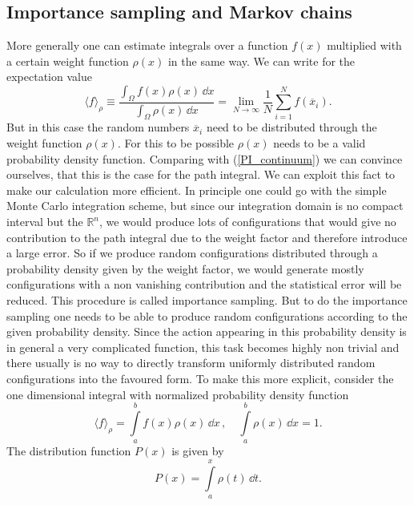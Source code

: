 \subsection{Importance sampling and Markov chains}
More generally one can estimate integrals over a function $f(x)$ multiplied with a certain weight function $\rho(x)$ in the same way. We can write for the expectation value
\begin{equation}
\langle f \rangle_{\rho} \equiv \dfrac{\int _{\Omega} f(x)\rho(x)\,\dd x}{\int _{\Omega} \rho(x)\,\dd x} = \lim\limits_{N\to\infty}\dfrac{1}{N}\sum\limits_{i=1}^{N} f(\overline{x}_{i}).
\end{equation}
But in this case the random numbers $\overline{x}_{i}$ need to be distributed through the weight function $\rho(x)$. For this to be possible $\rho(x)$ needs to be a valid probability density function.
Comparing with (\ref{PI_continuum}) we can convince ourselves, that this is the case for the  path integral. We can exploit this fact to make our calculation more efficient. In principle one could go with the simple Monte Carlo integration scheme, but since our integration domain is no compact interval but the $\mathbb{R}^{n}$, we would produce lots of configurations that would give no contribution to the path integral due to the weight factor and therefore introduce a large error. So if we produce random configurations distributed through a probability density given by the weight factor, we would generate mostly configurations with a non vanishing contribution and the statistical error will be reduced. This procedure is called importance sampling. But to do the importance sampling one needs to be able to produce random configurations according to the given probability density. Since the action appearing in this probability density is in general a very complicated function, this task becomes highly non trivial and there usually is no way to directly transform uniformly distributed random configurations into the favoured form. To make this more explicit, consider the one dimensional integral with normalized probability density function \cite{rothe}
%
%
\begin{equation}
\langle f \rangle_{\rho} = \int \limits_{a}^{b}f(x)\rho(x) \,\dd x\, , \quad \int\limits_{a}^{b} \rho(x)\, \dd x=1.
\end{equation}
%
%
The distribution function $P(x)$ is given by
\begin{equation}
P(x) = \int\limits_{a}^{x} \rho(t)\, \dd t .
\end{equation}
